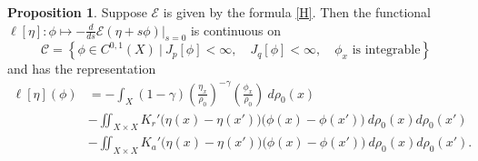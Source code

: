 \documentclass[10pt, letterpaper]{article}
\def\E{{\mathcal{E}}}
\theoremstyle{definition}
\newtheorem{proposition}[subsubsection]{Proposition}
\theoremstyle{remark}
\begin{document}
\begin{proposition} \label{continuity}
 Suppose $\E$ is given by the formula \eqref{H}. Then the functional $\ell[\eta] : \phi \mapsto -\frac{d}{ds} \E(\eta + s\phi) \Big|_{s=0}$ is continuous on 
 $$\displaystyle\mathcal{C}=\left\{\phi \in C^{0,1}(X) ~|~ J_p[\phi] < \infty, \quad J_q[\phi] < \infty, \quad \text{$\phi_x$ is integrable}\right\}$$ and has the representation
 \begin{equation} \label{ellrep}
 \begin{aligned}
  \ell[\eta](\phi)&=-\int_X (1-\gamma) \left(\frac{\eta_x}{\rho_0}\right)^{-\gamma}\left(\frac{\phi_x}{\rho_0}\right) \:d\rho_0(x)\\
  &-\iint_{X\times X} K_r'\Big(\eta(x) - \eta(x')\Big)\Big(\phi(x)-\phi(x')\Big)\: d\rho_0(x)d\rho_0(x')\\
  &-\iint_{X\times X} K_a'\Big(\eta(x) - \eta(x')\Big)\Big(\phi(x)-\phi(x')\Big)\: d\rho_0(x)d\rho_0(x').
 \end{aligned}
 \end{equation}
\end{proposition}
\end{document}
